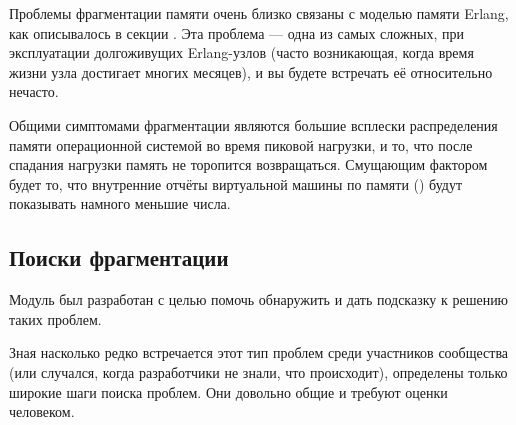 Проблемы фрагментации памяти очень близко связаны с моделью памяти Erlang, как описывалось в секции . Эта проблема --- одна из самых сложных, при эксплуатации долгоживущих Erlang-узлов (часто возникающая, когда время жизни узла достигает многих месяцев), и вы будете встречать её относительно нечасто.

Общими симптомами фрагментации являются большие всплески распределения памяти операционной системой во время пиковой нагрузки, и то, что после спадания нагрузки память не торопится возвращаться. Смущающим фактором будет то, что внутренние отчёты виртуальной машины по памяти () будут показывать намного меньшие числа.


\subsection{Поиски фрагментации}

Модуль  был разработан с целью помочь обнаружить и дать подсказку к решению таких проблем.

Зная насколько редко встречается этот тип проблем среди участников сообщества (или случался, когда разработчики не знали, что происходит), определены только широкие шаги поиска проблем. Они довольно общие и требуют оценки человеком.


